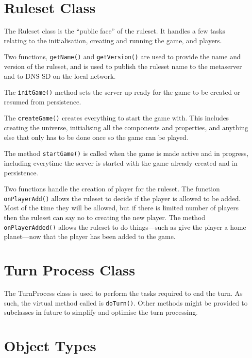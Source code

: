 \documentclass[a4paper,11pt]{report}
\begin{document}
\section{Ruleset Class}
\label{sec:ruleset-class}

The Ruleset class is the ``public face'' of the ruleset. It handles a few tasks relating to the initialisation, creating and running the game, and players.

Two functions, \texttt{getName()} and \texttt{getVersion()} are used to provide the name and version of the ruleset, and is used to publish the ruleset name to the metaserver and to DNS-SD on the local network.

The \texttt{initGame()} method sets the server up ready for the game to be created or resumed from persistence.

The \texttt{createGame()} creates everything to start the game with. This includes creating the universe, initialising all the components and properties, and anything else that only has to be done once so the game can be played.

The method \texttt{startGame()} is called when the game is made active and in progress, including everytime the server is started with the game already created and in persistence.

Two functions handle the creation of player for the ruleset.  The function \texttt{onPlayerAdd()} allows the ruleset to decide if the player is allowed to be added. Most of the time they will be allowed, but if there is limited number of players then the ruleset can say no to creating the new player. The method \texttt{onPlayerAdded()} allows the ruleset to do things---such as give the player a home planet---now that the player has been added to the game.

\section{Turn Process Class}
\label{sec:turn-process}

The TurnProcess class is used to perform the tasks required to end the turn. As such, the virtual method called is \texttt{doTurn()}.  Other methods might be provided to subclasses in future to simplify and optimise the turn processing.

\section{Object Types}
\label{sec:object-types}
\end{document}
